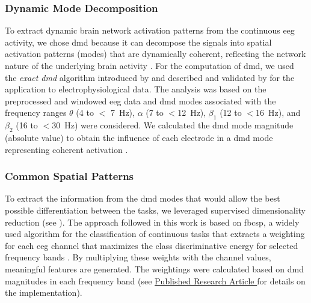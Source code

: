 \subsubsection{Dynamic Mode Decomposition}
To extract dynamic brain network activation patterns from the continuous \gls{eeg} activity, we chose \gls{dmd} because it can decompose the signals into spatial activation patterns (modes) that are dynamically coherent, reflecting the network nature of the underlying brain activity \cite{Brunton2016}. For the computation of \gls{dmd}, we used the \textit{exact \gls{dmd}} algorithm introduced by \citeauthor{Tu2014} \cite{Tu2014} and described and validated by \citeauthor{Brunton2016} \cite{Brunton2016} for the application to electrophysiological data. The analysis was based on the preprocessed and windowed \gls{eeg} data and \gls{dmd} modes associated with the frequency ranges $\theta$ (4 to $<$ 7~Hz), $\alpha$ (7 to $<$12~Hz), $\beta_1$ (12 to $<$16~Hz), and $\beta_2$ (16 to $<$30~Hz) were considered. We calculated the \gls{dmd} mode magnitude (absolute value) to obtain the influence of each electrode in a \gls{dmd} mode representing coherent activation \cite{Brunton2016}.

\subsubsection{Common Spatial Patterns}
To extract the information from the \gls{dmd} modes that would allow the best possible differentiation between the tasks, we leveraged supervised dimensionality reduction (see ). The approach followed in this work is based on \gls{fbcsp}, a widely used algorithm for the classification of continuous tasks that extracts a weighting for each \gls{eeg} channel that maximizes the class discriminative energy for selected frequency bands \cite{Ang2012}. By multiplying these weights with the channel values, meaningful features are generated. The weightings were calculated based on \gls{dmd} magnitudes in each frequency band (see \hyperref[pup:paperI]{Published Research Article } for details on the implementation).


